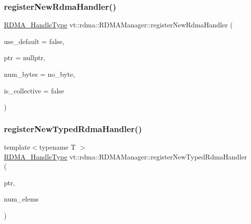 \mbox{\label{structvt_1_1rdma_1_1_r_d_m_a_manager_ab68308f4b3b72714f81a00755736b0b5}} 
\subsubsection{\texorpdfstring{register\+New\+Rdma\+Handler()}{registerNewRdmaHandler()}}
{\footnotesize\ttfamily \hyperlink{namespacevt_a10442579ec4e7ebef223818e64bcf908}{R\+D\+M\+A\+\_\+\+Handle\+Type} vt\+::rdma\+::\+R\+D\+M\+A\+Manager\+::register\+New\+Rdma\+Handler (\begin{DoxyParamCaption}\item[{bool const \&}]{use\+\_\+default = {\ttfamily false},  }\item[{\hyperlink{namespacevt_a9e2c953286c7616f7c218e9951790776}{R\+D\+M\+A\+\_\+\+Ptr\+Type} const \&}]{ptr = {\ttfamily nullptr},  }\item[{\hyperlink{namespacevt_aab8d55968084610ce3b17057981e9300}{Byte\+Type} const \&}]{num\+\_\+bytes = {\ttfamily no\+\_\+byte},  }\item[{bool const \&}]{is\+\_\+collective = {\ttfamily false} }\end{DoxyParamCaption})}

\mbox{\label{structvt_1_1rdma_1_1_r_d_m_a_manager_a69d6fc1f017047de79f3c1190e55ac53}} 
\subsubsection{\texorpdfstring{register\+New\+Typed\+Rdma\+Handler()}{registerNewTypedRdmaHandler()}}
{\footnotesize\ttfamily template$<$typename T $>$ \\
\hyperlink{namespacevt_a10442579ec4e7ebef223818e64bcf908}{R\+D\+M\+A\+\_\+\+Handle\+Type} vt\+::rdma\+::\+R\+D\+M\+A\+Manager\+::register\+New\+Typed\+Rdma\+Handler (\begin{DoxyParamCaption}\item[{T}]{ptr,  }\item[{\hyperlink{namespacevt_aab8d55968084610ce3b17057981e9300}{Byte\+Type} const \&}]{num\+\_\+elems }\end{DoxyParamCaption})\hspace{0.3cm}{\ttfamily [inline]}}

